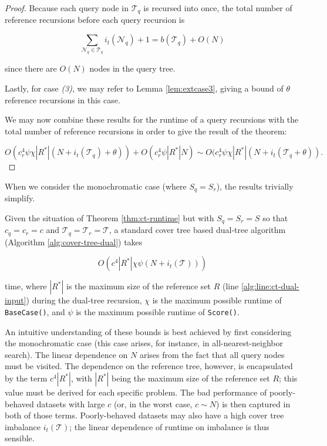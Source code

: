 \begin{proof}
Because each query node in $\mathscr{T}_q$ is recursed into once, the total
number of reference recursions before each query recursion is

\begin{equation}
\sum_{\mathscr{N}_q \in \mathscr{T}_q} i_t(\mathscr{N}_q) + 1 = b(\mathscr{T}_q) +
O(N)
\end{equation}

\noindent since there are $O(N)$ nodes in the query tree.

Lastly, for case \textit{(3)}, we may refer to Lemma \ref{lem:extcase3}, giving
a bound of $\theta$ reference recursions in this case.

We may now combine these results for the runtime of a query recursions with the
total number of reference recursions in order to give the result of the theorem:

\begin{equation}
O(c_r^4 \psi \chi | R^* | (N + i_t(\mathscr{T}_q) + \theta)) + O(c_r^4 \psi | R^* | N) \sim O(c_r^4 \psi
\chi |R^*| (N + i_t(\mathscr{T}_q + \theta)).
\end{equation}
\end{proof}

When we consider the monochromatic case (where $S_q = S_r$), the results
trivially simplify.

\begin{cor}
\label{cor:ct-runtime-mono}
Given the situation of Theorem \ref{thm:ct-runtime} but with $S_q = S_r = S$ so
that $c_q = c_r = c$ and $\mathscr{T}_q = \mathscr{T}_r = \mathscr{T}$, a
standard cover tree based dual-tree algorithm (Algorithm
\ref{alg:cover-tree-dual}) takes

\begin{equation}
O\left(c^4 |R^*| \chi \psi (N + i_t(\mathscr{T}))\right)
\end{equation}

\noindent time, where $ | R^* | $ is the maximum size of the reference set $R$
(line \ref{alg:line:ct-dual-input}) during the dual-tree recursion, $\chi$ is
the maximum possible runtime of \texttt{BaseCase()}, and $\psi$ is the maximum
possible runtime of \texttt{Score()}.
\end{cor}

An intuitive understanding of these bounds is best achieved by first considering
the monochromatic case (this case arises, for instance, in all-nearest-neighbor
search).  The linear dependence on $N$ arises from the fact that all query nodes
must be visited.  The dependence on the reference tree, however, is encapsulated
by the term $c^4 |R^*|$, with $|R^*|$ being the maximum size of the reference
set $R$; this value must be derived for each specific problem.  The bad
performance of poorly-behaved datasets with large $c$ (or, in the worst case, $c
\sim N$) is then captured in both of those terms.  Poorly-behaved datasets may
also have a high cover tree imbalance $i_t(\mathscr{T})$; the linear dependence of
runtime on imbalance is thus sensible.

